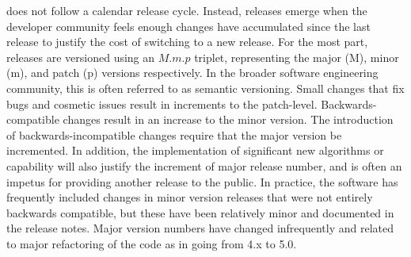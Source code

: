 \clawpack does not follow a calendar release cycle.  Instead, releases
emerge when the developer community feels enough changes have
accumulated since the last release to justify
the cost of switching to a new release.  For the most part, \clawpack
releases are
versioned using an $M.m.p$ triplet, representing the major (M), minor (m), and
patch (p) versions respectively.  In the broader software engineering
community, this is often referred to as semantic versioning.  Small
changes that fix bugs and cosmetic issues result in increments to the
patch-level.  Backwards-compatible changes result in an increase to
the minor version.  The introduction of backwards-incompatible changes
require that the major version be incremented.  In addition, the
implementation of significant new algorithms or capability will also
justify the increment of major release number, and is often an impetus
for providing another release to the public.
In practice, the \clawpack software has frequently included changes in minor
version releases that were not entirely backwards compatible, but these have
been relatively minor and documented in the release notes.  Major version
numbers have changed infrequently and related to major refactoring of the
code as in going from 4.x to 5.0.

